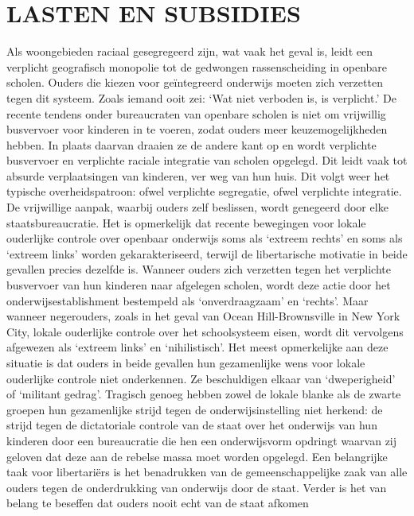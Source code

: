 \documentclass[
  a5paper,
  smalldemyvopaper,10pt,twoside,onecolumn,openright,extrafontsizes,hidelinks]{memoir}
\begin{document}
\section{LASTEN EN SUBSIDIES}\label{lasten-en-subsidies}

Als woongebieden raciaal gesegregeerd zijn, wat vaak het geval is, leidt
een verplicht geografisch monopolie tot de gedwongen rassenscheiding in
openbare scholen. Ouders die kiezen voor geïntegreerd onderwijs moeten
zich verzetten tegen dit systeem. Zoals iemand ooit zei: `Wat niet
verboden is, is verplicht.' De recente tendens onder bureaucraten van
openbare scholen is niet om vrijwillig busvervoer voor kinderen in te
voeren, zodat ouders meer keuzemogelijkheden hebben. In plaats daarvan
draaien ze de andere kant op en wordt verplichte busvervoer en
verplichte raciale integratie van scholen opgelegd. Dit leidt vaak tot
absurde verplaatsingen van kinderen, ver weg van hun huis. Dit volgt
weer het typische overheidspatroon: ofwel verplichte segregatie, ofwel
verplichte integratie. De vrijwillige aanpak, waarbij ouders zelf
beslissen, wordt genegeerd door elke staatsbureaucratie. Het is
opmerkelijk dat recente bewegingen voor lokale ouderlijke controle over
openbaar onderwijs soms als `extreem rechts' en soms als `extreem links'
worden gekarakteriseerd, terwijl de libertarische motivatie in beide
gevallen precies dezelfde is. Wanneer ouders zich verzetten tegen het
verplichte busvervoer van hun kinderen naar afgelegen scholen, wordt
deze actie door het onderwijsestablishment bestempeld als
`onverdraagzaam' en `rechts'. Maar wanneer negerouders, zoals in het
geval van Ocean Hill-Brownsville in New York City, lokale ouderlijke
controle over het schoolsysteem eisen, wordt dit vervolgens afgewezen
als `extreem links' en `nihilistisch'. Het meest opmerkelijke aan deze
situatie is dat ouders in beide gevallen hun gezamenlijke wens voor
lokale ouderlijke controle niet onderkennen. Ze beschuldigen elkaar van
`dweperigheid' of `militant gedrag'. Tragisch genoeg hebben zowel de
lokale blanke als de zwarte groepen hun gezamenlijke strijd tegen de
onderwijsinstelling niet herkend: de strijd tegen de dictatoriale
controle van de staat over het onderwijs van hun kinderen door een
bureaucratie die hen een onderwijsvorm opdringt waarvan zij geloven dat
deze aan de rebelse massa moet worden opgelegd. Een belangrijke taak
voor libertariërs is het benadrukken van de gemeenschappelijke zaak van
alle ouders tegen de onderdrukking van onderwijs door de staat. Verder
is het van belang te beseffen dat ouders nooit echt van de staat afkomen
\end{document}
